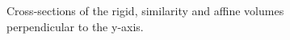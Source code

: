 	\begin{figure}[htbp]
	  \centering
	  \caption{Cross-sections of the rigid, similarity and affine volumes perpendicular to the y-axis.}
	  \label{fig:hires_1_287}
	\end{figure}


